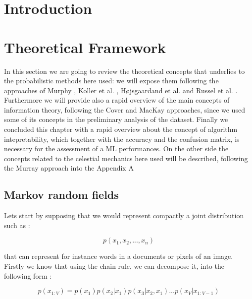 \documentclass[12pt,%
               a4paper,%
               oneside,openany,%
               titlepage,%
               headinclude,footinclude,%
               BCOR5mm,%
               cleardoublepage=empty,%
               tablecaptionabove,%
               floatperchapter,
               ]{scrreprt}                 %
\begin{document}
\newpage

\chapter{Introduction}

\chapter{Theoretical Framework}

In this section we are going to review the theoretical concepts that underlies to the probabilistic methods here used:  we will expose them following the approaches of Murphy \cite{murphy2012machine},  Koller et al. \cite{koller2009probabilistic}, H{\o}jsgaardand \cite{hojsgaard2012graphical} et al.  and Russel et al. \cite{russell2010artificial}.  Furthermore we will provide also a rapid overview of the main concepts of information theory,  following the Cover \cite{cover2006elements} and MacKay \cite{mackay2003information} approaches,  since we used some of its concepts in the preliminary analysis of the dataset. Finally we concluded this chapter with a rapid overview about the concept of algorithm intepretability, which together with the accuracy and the confusion matrix, is necessary for the assessment of a ML performances. On the other side the concepts related to the celestial mechanics here used will be described, following the Murray approach \cite{murray1999solar} into the Appendix A

\section{Markov random fields}

Lets start by supposing that we would represent compactly a joint distribution such as \cite{murphy2012machine}:

\begin{equation}
p(x_{1},x_{2},...,x_{n})
\end{equation}

that can represent for instance words in a documents or pixels of an image.  Firstly we know that using the chain rule,  we can decompose it, into the following form \cite{murphy2012machine}:

\begin{equation}
p(x_{1:V})=p(x_{1})p(x_{2}|x_{1})p(x_{3}|x_{2},x_{1})...p(x_{V}|x_{1:V-1})
\end{equation}
\end{document}
